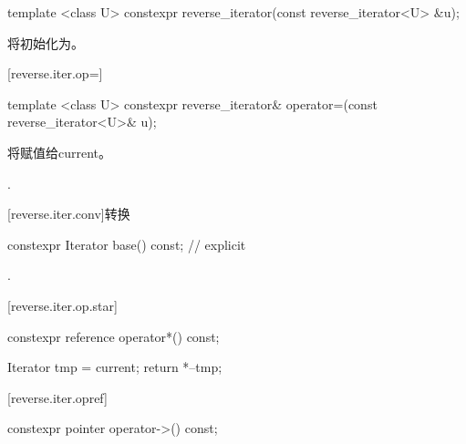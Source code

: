 \begin{itemdecl}
template <class U> constexpr reverse_iterator(const reverse_iterator<U> &u);
\end{itemdecl}

\begin{itemdescr}
\pnum
\effects
将初始化为。
\end{itemdescr}

[reverse.iter.op=]{}

%
\begin{itemdecl}
template <class U>
constexpr reverse_iterator&
  operator=(const reverse_iterator<U>& u);
\end{itemdecl}

\begin{itemdescr}
\pnum
\effects
将赋值给current。

\pnum
\returns
{}.
\end{itemdescr}

[reverse.iter.conv]{转换}

%
%
\begin{itemdecl}
constexpr Iterator base() const;          // explicit
\end{itemdecl}

\begin{itemdescr}
\pnum
\returns
{}.
\end{itemdescr}

[reverse.iter.op.star]{}

%
\begin{itemdecl}
constexpr reference operator*() const;
\end{itemdecl}

\begin{itemdescr}
\pnum
\effects
\begin{codeblock}
Iterator tmp = current;
return *--tmp;
\end{codeblock}

\end{itemdescr}

[reverse.iter.opref]{}

%
\begin{itemdecl}
constexpr pointer operator->() const;
\end{itemdecl}

